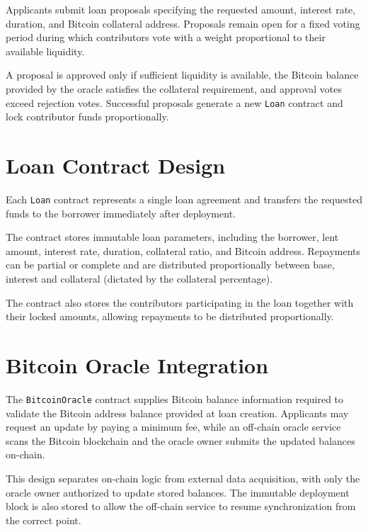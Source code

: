 Applicants submit loan proposals specifying the requested amount, interest rate, duration, and Bitcoin collateral address. Proposals remain open for a fixed voting period during which contributors vote with a weight proportional to their available liquidity.

A proposal is approved only if sufficient liquidity is available, the Bitcoin balance provided by the oracle satisfies the collateral requirement, and approval votes exceed rejection votes. Successful proposals generate a new \texttt{Loan} contract and lock contributor funds proportionally.

\section{Loan Contract Design}

Each \texttt{Loan} contract represents a single loan agreement and transfers the requested funds to the borrower immediately after deployment.

The contract stores immutable loan parameters, including the borrower, lent amount, interest rate, duration, collateral ratio, and Bitcoin address. Repayments can be partial or complete and are distributed proportionally between base, interest and collateral (dictated by the collateral percentage).

The contract also stores the contributors participating in the loan together with their locked amounts, allowing repayments to be distributed proportionally.

\section{Bitcoin Oracle Integration}

The \texttt{BitcoinOracle} contract supplies Bitcoin balance information required to validate the Bitcoin address balance provided at loan creation. Applicants may request an update by paying a minimum fee, while an off-chain oracle service scans the Bitcoin blockchain and the oracle owner submits the updated balances on-chain.

This design separates on-chain logic from external data acquisition, with only the oracle owner authorized to update stored balances. The immutable deployment block is also stored to allow the off-chain service to resume synchronization from the correct point.

